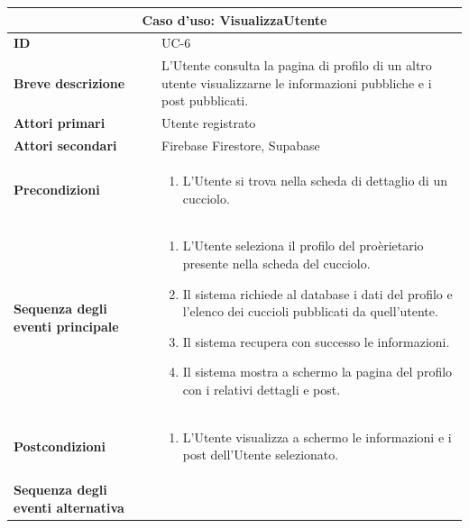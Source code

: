 \documentclass[a4paper]{report}
\begin{document}
\begin{table}[H]
\vspace*{-0cm}
\renewcommand{\arraystretch}{1.9}
\begin{tabular}{|p{3.9cm}|p{9.9cm}|}
\hline
\multicolumn{2}{|c|}{\textbf{Caso d’uso: VisualizzaUtente}} \\ \hline
\textbf{ID} & UC-6 \\ \hline
\textbf{Breve descrizione} & L'Utente consulta la pagina di profilo di un altro utente visualizzarne le informazioni pubbliche e i post pubblicati. \\ \hline
\textbf{Attori primari} & Utente registrato \\ \hline
\textbf{Attori secondari} & Firebase Firestore, Supabase \\ \hline
\textbf{Precondizioni} & \begin{enumerate}[leftmargin=14pt,label=\arabic*.,labelsep=0.5em,topsep=0pt,partopsep=0pt,parsep=0pt,itemsep=0pt]
    \item L'Utente si trova nella scheda di dettaglio di un cucciolo.
\end{enumerate} \\ \hline
\textbf{Sequenza degli eventi principale} &
\begin{enumerate}[leftmargin=14pt,label=\arabic*.,labelsep=0.5em,topsep=0pt,partopsep=0pt,parsep=0pt,itemsep=0pt]
   \item L'Utente seleziona il profilo del proèrietario presente nella scheda del cucciolo.
   \item Il sistema richiede al database i dati del profilo e l'elenco dei cuccioli pubblicati da quell'utente.
   \item Il sistema recupera con successo le informazioni.
   \item Il sistema mostra a schermo la pagina del profilo con i relativi dettagli e post.
\end{enumerate}\\ \hline
\textbf{Postcondizioni} &
\begin{enumerate}[leftmargin=14pt,label=\arabic*.,labelsep=0.5em,topsep=0pt,partopsep=0pt,parsep=0pt,itemsep=0pt]
\item L'Utente visualizza a schermo le informazioni e i post dell'Utente selezionato.
\end{enumerate} \\ \hline
\textbf{Sequenza degli eventi alternativa} & \begin{enumerate}[leftmargin=14pt,label=\arabic*.,labelsep=0.5em,topsep=0pt,partopsep=0pt,parsep=0pt,itemsep=0pt]

\end{enumerate}
\end{tabular}
\end{table}
\end{document}
